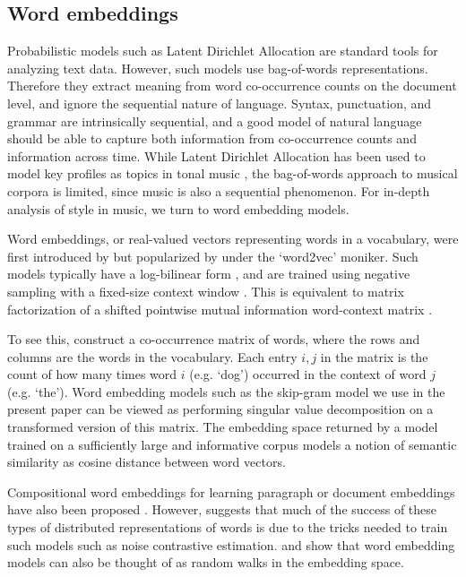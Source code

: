 
\subsection{Word embeddings}
Probabilistic models such as Latent Dirichlet Allocation \cite{Blei2003} are standard tools for analyzing text data. However, such models use bag-of-words representations. Therefore they extract meaning from word co-occurrence counts on the document level, and ignore the sequential nature of language. Syntax, punctuation, and grammar are intrinsically sequential, and a good model of natural language should be able to capture both information from co-occurrence counts and information across time. While Latent Dirichlet Allocation has been used to model key profiles as topics in tonal music \cite{Hu2009}, the bag-of-words approach to musical corpora is limited, since music is also a sequential phenomenon. For in-depth analysis of style in music, we turn to word embedding models.

Word embeddings, or real-valued vectors representing words in a vocabulary, were first introduced by \cite{Bengio2003} but popularized by \cite{Mikolov2013a} under the `word2vec' moniker. Such models typically have a log-bilinear form \cite{Mnih2007}, and are trained using negative sampling with a fixed-size context window \cite{Mikolov2013a}. This is equivalent to matrix factorization of a shifted pointwise mutual information word-context matrix \cite{Levy}. 

To see this, construct a co-occurrence matrix of words, where the rows and columns are the words in the vocabulary. Each entry $i, j$ in the matrix is the count of how many times word $i$ (e.g. `dog') occurred in the context of word $j$ (e.g. `the'). Word embedding models such as the skip-gram model we use in the present paper can be viewed as performing singular value decomposition on a transformed version of this matrix. The embedding space returned by a model trained on a sufficiently large and informative corpus models a notion of semantic similarity as cosine distance between word vectors.

Compositional word embeddings for learning paragraph or document embeddings have also been proposed \cite{Le2014,Dai2015}. However, \cite{Levy2015a} suggests that much of the success of these types of distributed representations of words is due to the tricks needed to train such models such as noise contrastive estimation. \cite{Arora2015} and \cite{Arora2016} show that word embedding models can also be thought of as random walks in the embedding space. 


